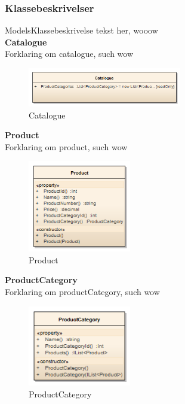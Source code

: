 \subsubsection{Klassebeskrivelser}
ModelsKlassebeskrivelse tekst her, wooow\\


\textbf{Catalogue}\\
Forklaring om catalogue, such wow


\begin{figure}[H]
    \centering
    \includegraphics[width=0.6\textwidth]{Systemdesign/SharedLib/Images/Klasser/Model/Catalogue.png}
    \caption{Catalogue}
    \label{fig:klasseModelCata}
\end{figure}

\textbf{Product}\\
Forklaring om product, such wow


\begin{figure}[H]
    \centering
    \includegraphics[width=0.4\textwidth]{Systemdesign/SharedLib/Images/Klasser/Model/Product.png}
    \caption{Product}
    \label{fig:klasseModelPrd}
\end{figure}

\textbf{ProductCategory}\\
Forklaring om productCategory, such wow


\begin{figure}[H]
    \centering
    \includegraphics[width=0.4\textwidth]{Systemdesign/SharedLib/Images/Klasser/Model/ProductCategory.png}
    \caption{ProductCategory}
    \label{fig:klasseModelPrdCtg}
\end{figure}



